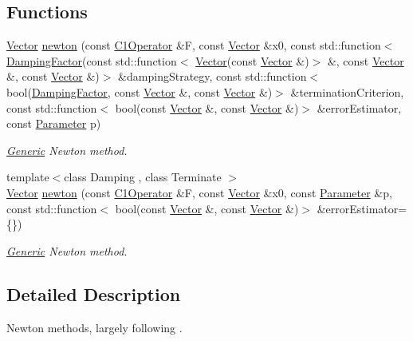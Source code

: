 \subsection*{Functions}
\begin{DoxyCompactItemize}
\item 
\hyperlink{classSpacy_1_1Vector}{Vector} \hyperlink{namespaceSpacy_1_1Newton_abb96a752061c77bc7ba166c6e3184ca3}{newton} (const \hyperlink{classSpacy_1_1C1Operator}{C1\+Operator} \&F, const \hyperlink{classSpacy_1_1Vector}{Vector} \&x0, const std\+::function$<$ \hyperlink{classSpacy_1_1DampingFactor}{Damping\+Factor}(const std\+::function$<$ \hyperlink{classSpacy_1_1Vector}{Vector}(const \hyperlink{classSpacy_1_1Vector}{Vector} \&)$>$ \&, const \hyperlink{classSpacy_1_1Vector}{Vector} \&, const \hyperlink{classSpacy_1_1Vector}{Vector} \&)$>$ \&damping\+Strategy, const std\+::function$<$ bool(\hyperlink{classSpacy_1_1DampingFactor}{Damping\+Factor}, const \hyperlink{classSpacy_1_1Vector}{Vector} \&, const \hyperlink{classSpacy_1_1Vector}{Vector} \&)$>$ \&termination\+Criterion, const std\+::function$<$ bool(const \hyperlink{classSpacy_1_1Vector}{Vector} \&, const \hyperlink{classSpacy_1_1Vector}{Vector} \&)$>$ \&error\+Estimator, const \hyperlink{structSpacy_1_1Newton_1_1Parameter}{Parameter} p)
\begin{DoxyCompactList}\small\item\em \hyperlink{namespaceSpacy_1_1Generic}{Generic} Newton method. \end{DoxyCompactList}\item 
{\footnotesize template$<$class Damping , class Terminate $>$ }\\\hyperlink{classSpacy_1_1Vector}{Vector} \hyperlink{namespaceSpacy_1_1Newton_ae58104a160c7335748a9b800b2317c6d}{newton} (const \hyperlink{classSpacy_1_1C1Operator}{C1\+Operator} \&F, const \hyperlink{classSpacy_1_1Vector}{Vector} \&x0, const \hyperlink{structSpacy_1_1Newton_1_1Parameter}{Parameter} \&p, const std\+::function$<$ bool(const \hyperlink{classSpacy_1_1Vector}{Vector} \&, const \hyperlink{classSpacy_1_1Vector}{Vector} \&)$>$ \&error\+Estimator=\{\})
\begin{DoxyCompactList}\small\item\em \hyperlink{namespaceSpacy_1_1Generic}{Generic} Newton method. \end{DoxyCompactList}\end{DoxyCompactItemize}


\subsection{Detailed Description}
Newton methods, largely following \cite{Deuflhard2004}. 


